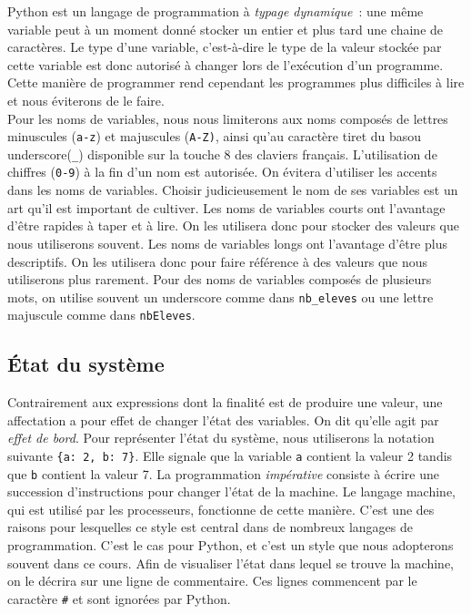 \documentclass{magnolia}
\begin{document}
Python est un langage de programmation à \emph{typage dynamique}~: une même
variable peut à un moment donné stocker un entier et plus tard une chaine de caractères.
Le type d'une variable, c'est-à-dire le type de la valeur stockée par cette variable est
donc autorisé à changer lors de l'exécution d'un programme. Cette manière de programmer
rend cependant les programmes plus difficiles à lire et nous éviterons de le faire.\\

Pour les noms de variables, nous nous limiterons aux noms composés de lettres minuscules
(\verb_a-z_) et majuscules (\verb_A-Z)_, ainsi qu'au caractère \og tiret du bas\fg ou \og
underscore\fg (\verb-_-) disponible sur la touche 8 des claviers français. L'utilisation de chiffres (\verb_0-9_) à
la fin d'un nom est autorisée. On évitera
d'utiliser les accents dans les noms de variables. 
Choisir
judicieusement le nom de ses variables est un art qu'il est important de cultiver. Les noms
de variables courts ont l'avantage d'être rapides à taper et à lire. On les utilisera donc
pour stocker des valeurs que nous utiliserons souvent. Les noms de variables longs ont
l'avantage d'être plus descriptifs. On les utilisera donc pour faire référence à des valeurs
que nous utiliserons plus rarement. Pour des noms de variables composés de plusieurs mots, on utilise
souvent un underscore comme dans \verb-nb_eleves- ou une lettre majuscule comme dans
\verb_nbEleves_.

\subsection{État du système}

Contrairement aux expressions dont la finalité est de produire une valeur, une affectation
a pour effet de changer l'état des variables. On dit qu'elle agit par \emph{effet de bord}.
Pour représenter l'état du système, nous utiliserons la notation suivante
\verb_{a: 2, b: 7}_. Elle signale que la variable \verb_a_ contient la valeur 2 tandis que
\verb_b_ contient la valeur 7. La programmation \emph{impérative} consiste à écrire une
succession d'instructions pour changer l'état de la machine. Le langage machine, qui est utilisé par les processeurs, fonctionne de cette manière. C'est une des raisons pour
lesquelles ce style est central dans de nombreux langages de programmation. C'est le cas pour
Python, et c'est un style que nous adopterons souvent dans ce cours. Afin de visualiser l'état
dans lequel se trouve la machine, on le décrira sur
une ligne de commentaire. Ces lignes commencent par le caractère \verb_#_ et sont ignorées
par Python.\\
\end{document}
